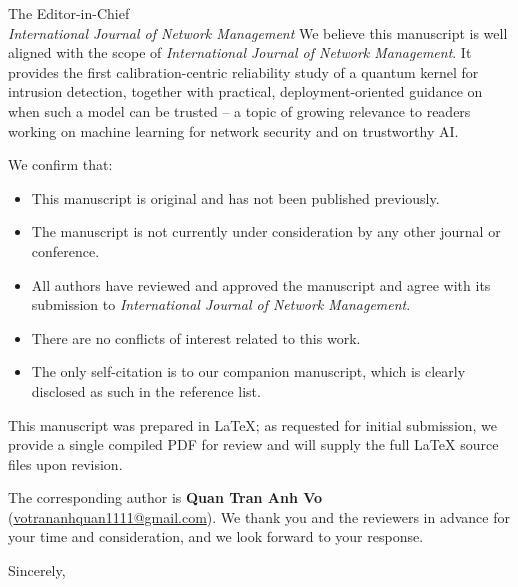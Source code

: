 \documentclass[11pt]{letter}
\begin{document}
\begin{letter}{%
  The Editor-in-Chief\\
  \textit{International Journal of Network Management}}
We believe this manuscript is well aligned with the scope of \textit{International Journal of Network Management}.
It provides the first calibration-centric reliability study of a quantum kernel for
intrusion detection, together with practical, deployment-oriented guidance on when such
a model can be trusted -- a topic of growing relevance to readers working on machine
learning for network security and on trustworthy AI.

We confirm that:

\begin{itemize}
\item This manuscript is original and has not been published previously.
\item The manuscript is not currently under consideration by any other journal or
      conference.
\item All authors have reviewed and approved the manuscript and agree with its
      submission to \textit{International Journal of Network Management}.
\item There are no conflicts of interest related to this work.
\item The only self-citation is to our companion manuscript, which is clearly disclosed
      as such in the reference list.
\end{itemize}

This manuscript was prepared in \LaTeX{}; as requested for initial submission, we
provide a single compiled PDF for review and will supply the full \LaTeX{} source
files upon revision.

The corresponding author is \textbf{Quan Tran Anh Vo}
(\href{mailto:votrananhquan1111@gmail.com}{votrananhquan1111@gmail.com}). We thank you
and the reviewers in advance for your time and consideration, and we look forward to
your response.

\closing{Sincerely,}

\end{letter}
\end{document}

